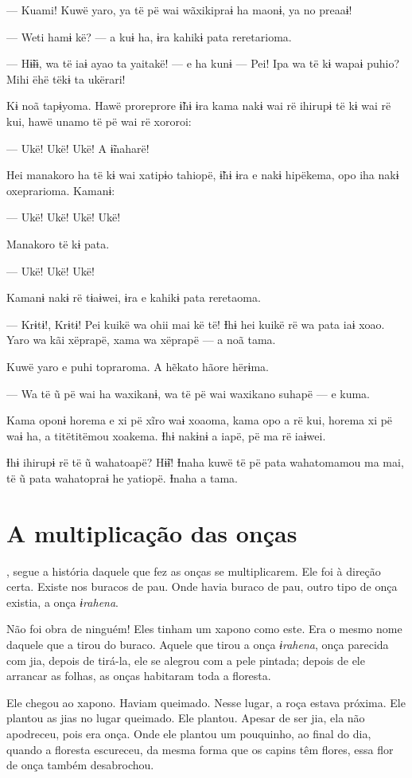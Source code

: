 --- Kuami! Kuwë yaro, ya të pë wai wãxikipraɨ ha maonɨ, ya no preaaɨ! 

--- Weti hamɨ kë? --- a kuɨ ha, ɨra kahikɨ pata reretarioma.

--- Hɨ̃ɨɨ, wa të iaɨ ayao ta yaitakë! --- e ha kunɨ --- Pei! Ipa wa të kɨ
wapaɨ puhio? Mihi ëhë tëkɨ ta ukërari! 

Kɨ noã tapɨyoma. Hawë proreprore ɨ̃hɨ ɨra kama nakɨ wai rë ihirupɨ të kɨ
wai rë kui, hawë unamo të pë wai rë xororoi: 

--- Ukë! Ukë! Ukë! A ɨ̃naharë! 

Hei manakoro ha të kɨ wai xatipɨo tahiopë, ɨ̃hɨ ɨra e nakɨ hipëkema, opo
iha nakɨ oxeprarioma. Kamanɨ: 

--- Ukë! Ukë! Ukë! Ukë! 

Manakoro të kɨ pata. 

--- Ukë! Ukë! Ukë! 

Kamanɨ nakɨ rë tɨaɨwei, ɨra e kahikɨ pata reretaoma. 

--- Krɨtɨ!, Krɨtɨ! Pei kuikë wa ohii mai kë të! Ɨhɨ hei kuikë rë wa pata
iaɨ xoao. Yaro wa kãi xëprapë, xama wa xëprapë --- a noã tama. 

Kuwë yaro e puhi topraroma. A hẽkato hãore hërɨma. 

--- Wa të ũ pë wai ha waxikanɨ, wa të pë wai waxikano suhapë --- e
kuma. 

Kama oponɨ horema e xi pë xĩro waɨ xoaoma, kama opo a rë kui, horema xi
pë waɨ ha, a titëtitëmou xoakema. Ɨhɨ nakɨnɨ a iapë, pë ma rë iaɨwei. 

Ɨhɨ ihirupɨ rë të ũ wahatoapë? Hɨ̃ɨ! Ɨnaha kuwë të pë pata wahatomamou ma
mai, të ũ pata wahatopraɨ he yatiopë. Ɨnaha a tama. 
 
\chapter{A multiplicação das onças}

, segue a história daquele que fez as onças se multiplicarem.
Ele foi à direção certa. Existe nos buracos de pau. Onde havia buraco de
pau, outro tipo de onça existia, a onça \textit{ɨrahena}. 

Não foi obra de ninguém! Eles tinham um xapono como este. Era o mesmo nome
daquele que a tirou do buraco. Aquele que tirou a onça \textit{ɨrahena},
onça parecida com jia, depois de tirá-la, ele se alegrou com a pele
pintada; depois de ele arrancar as folhas, as onças habitaram toda a
floresta. 

Ele chegou ao xapono. Haviam queimado. Nesse lugar, a roça estava
próxima. Ele plantou as jias no lugar queimado. Ele plantou. Apesar de
ser jia, ela não apodreceu, pois era onça. Onde ele plantou um pouquinho,
ao final do dia, quando a floresta escureceu, da mesma forma que os
capins têm flores, essa flor de onça também desabrochou. 

